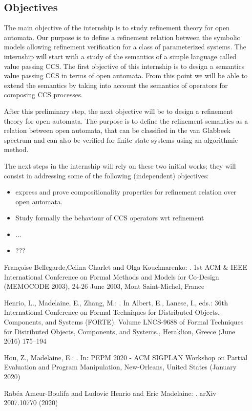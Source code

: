\documentclass[11pt,fleqn]{article}
\begin{document}
\subsection*{Objectives}


The main objective of the internship is to study refinement theory for open automata.  
Our purpose is to define a refinement relation between the symbolic models allowing refinement verification for a class of parameterized systems.
The internship will start with a study of the semantics of a simple language called value passing CCS. The first objective of this internship is to design a semantics value passing CCS in terms of open automata. From this point we will be able to extend the semantics by taking into account the semantics of operators for composing CCS processes.

After this preliminary step, the next objective will be to design a refinement theory for open automata. The purpose is to define the refinement semantics as a relation between open automata, that  can be classified in the van Glabbeek spectrum and can also be verified for finite state systems using an algorithmic method.


The next steps in the internship will rely on these two initial works; they will consist in addressing some of the following (independent) objectives:
\begin{itemize}
\item express and prove compositionality properties for refinement relation over open automata.
\item Study formally the behaviour of CCS operators wrt refinement
\item  ...
\item ???
\end{itemize}

\begin{thebibliography}{9}

Fran{\c{c}}oise Bellegarde,Celina Charlet and Olga Kouchnarenko:
.
\newblock 1st {ACM} {\&} {IEEE} International Conference on Formal Methods and Models for Co-Design {(MEMOCODE} 2003), 24-26 June 2003, Mont Saint-Michel, France

Henrio, L., Madelaine, E., Zhang, M.:
.
\newblock In Albert, E., Lanese, I., eds.: {36th International Conference on
  Formal Techniques for Distributed Objects, Components, and Systems (FORTE)}.
  Volume LNCS-9688 of Formal Techniques for Distributed Objects, Components,
  and Systems., Heraklion, Greece (June 2016)  175--194

Hou, Z., Madelaine, E.:
.
\newblock In: {PEPM 2020 - ACM SIGPLAN Workshop on Partial Evaluation and
  Program Manipulation}, New-Orleans, United States (January 2020)

Rabéa Ameur-Boulifa and Ludovic Henrio and Eric Madelaine:
.
\newblock arXiv {2007.10770} (2020)
\end{thebibliography}
\end{document}
